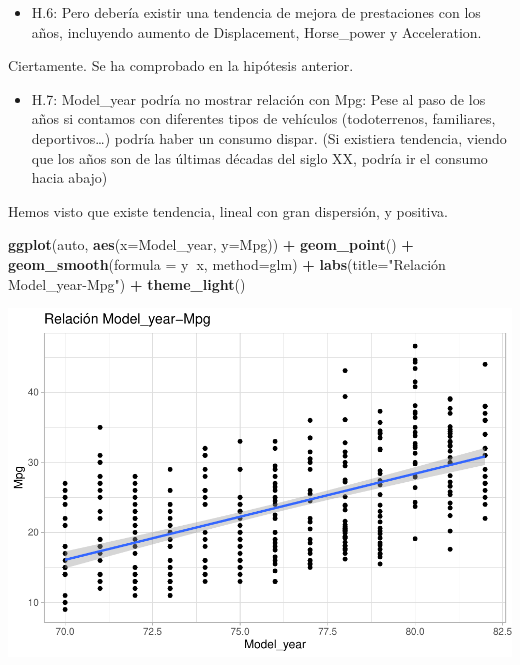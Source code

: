 \documentclass[
]{article}
\newenvironment{Shaded}{\begin{snugshade}}{\end{snugshade}}
\newcommand{\DataTypeTok}[1]{\textcolor[rgb]{0.13,0.29,0.53}{#1}}
\newcommand{\KeywordTok}[1]{\textcolor[rgb]{0.13,0.29,0.53}{\textbf{#1}}}
\newcommand{\NormalTok}[1]{#1}
\newcommand{\OperatorTok}[1]{\textcolor[rgb]{0.81,0.36,0.00}{\textbf{#1}}}
\newcommand{\StringTok}[1]{\textcolor[rgb]{0.31,0.60,0.02}{#1}}
\providecommand{\tightlist}{%
  \setlength{\itemsep}{0pt}\setlength{\parskip}{0pt}}
\begin{document}
\begin{itemize}
\tightlist
\item
  H.6: Pero debería existir una tendencia de mejora de prestaciones con
  los años, incluyendo aumento de Displacement, Horse\_power y
  Acceleration.
\end{itemize}

Ciertamente. Se ha comprobado en la hipótesis anterior.

\begin{itemize}
\tightlist
\item
  H.7: Model\_year podría no mostrar relación con Mpg: Pese al paso de
  los años si contamos con diferentes tipos de vehículos (todoterrenos,
  familiares, deportivos\ldots) podría haber un consumo dispar. (Si
  existiera tendencia, viendo que los años son de las últimas décadas
  del siglo XX, podría ir el consumo hacia abajo)
\end{itemize}

Hemos visto que existe tendencia, lineal con gran dispersión, y
positiva.

\begin{Shaded}
\begin{Highlighting}[]
\KeywordTok{ggplot}\NormalTok{(auto, }\KeywordTok{aes}\NormalTok{(}\DataTypeTok{x=}\NormalTok{Model_year, }\DataTypeTok{y=}\NormalTok{Mpg)) }\OperatorTok{+}
\StringTok{  }\KeywordTok{geom_point}\NormalTok{() }\OperatorTok{+}
\StringTok{  }\KeywordTok{geom_smooth}\NormalTok{(}\DataTypeTok{formula =}\NormalTok{ y}\OperatorTok{~}\NormalTok{x, }\DataTypeTok{method=}\NormalTok{glm) }\OperatorTok{+}
\StringTok{  }\KeywordTok{labs}\NormalTok{(}\DataTypeTok{title=}\StringTok{"Relación Model_year-Mpg"}\NormalTok{) }\OperatorTok{+}
\StringTok{  }\KeywordTok{theme_light}\NormalTok{()}
\end{Highlighting}
\end{Shaded}

\begin{center}\includegraphics{EDA_files/figure-latex/unnamed-chunk-32-1} \end{center}
\end{document}

